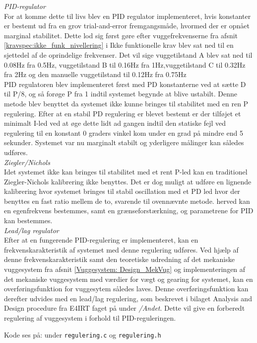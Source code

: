 \textit{PID-regulator}\\
For at komme dette til livs blev en PID regulator implementeret, hvis konstanter er bestemt ud fra en grov trial-and-error fremgangsmåde, hvormed der er opnået marginal stabilitet. Dette lod sig først gøre efter vuggefrekvenserne fra afsnit \vref{kravspec:ikke_funk_nivellering} i Ikke funktionelle krav blev sat ned til en sjettedel af de oprindelige frekvenser. Det vil sige vuggetilstand A blev sat ned til 0.08Hz fra 0.5Hz, vuggetilstand B til 0.16Hz fra 1Hz,vuggetilstand C til 0.32Hz fra 2Hz og den manuelle vuggetilstand til 0.12Hz fra 0.75Hz  \\ 
PID regulatoren blev implementeret først med PD konstanterne ved at sætte D til P/8, og så forøge P fra 1 indtil systemet begynde at blive ustabilt. Denne metode blev benyttet da systemet ikke kunne bringes til stabilitet med en ren P regulering. Efter at en stabil PD regulering er blevet bestemt er der tilføjet et minimalt I-led ved at øge dette lidt ad gangen indtil den statiske fejl ved regulering til en konstant 0 graders vinkel kom under en grad på mindre end 5 sekunder. Systemet var nu marginalt stabilt og yderligere målinger kan således udføres. \\

\textit{Ziegler/Nichols}\\
Idet systemet ikke kan bringes til stabilitet med et rent P-led kan en traditionel Ziegler-Nichols kalibrering ikke benyttes. Det er dog muligt at udføre en lignende kalibrering hvor systemet bringes til stabil oscillation med et PD led hvor der benyttes en fast ratio mellem de to, svarende til ovennævnte metode. herved kan en egenfrekvens bestemmes, samt en grænseforstærkning, og parametrene for PID kan bestemmes.\\

\textit{Lead/lag regulator}\\
Efter at en fungerende PID-regulering er implementeret, kan en frekvenskarakteristik af systemet med denne regulering udføres. Ved hjælp af denne frekvenskarakteristik samt den teoretiske udredning af det mekaniske vuggesystem fra afsnit \vref{Vuggesystem: Design_MekVug} og implementeringen af det mekaniske vuggesystem med værdier for vægt og gearing for systemet, kan en overføringsfunktion for vuggesytem således laves. Denne overføringsfunktion kan derefter udvides med en lead/lag regulering, som beskrevet i bilaget Analysis and Design procedure \citep{IRT} fra E4IRT faget på \citep{cd} under \textit{/Andet}. Dette vil give en forberedt regulering af vuggesystem i forhold til PID-reguleringen.

Kode ses på: \citep{cd} under \verb+regulering.c+ og \verb+regulering.h+\\

\newpage